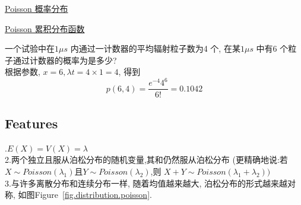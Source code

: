 \documentclass{article}
\begin{document}
\href{http://upload.wikimedia.org/wikipedia/commons/thumb/c/c1/Poisson\_distribution\_PMF.png/325px-Poisson\_distribution\_PMF.png}{Poisson 概率分布}\label{fig.distribution.poisson}

\href{http://upload.wikimedia.org/wikipedia/commons/thumb/8/84/Poisson\_distribution\_CMF.png/325px-Poisson\_distribution\_CMF.png}{Poisson 累积分布函数}\label{fig.distribution.poisson.pmf}

\begin{example}
一个试验中在$1 \mu s$ 内通过一计数器的平均辐射粒子数为4 个, 在某$1\mu s$ 中有6 个粒子通过计数器的概率为是多少?\\
根据参数, $x=6, \lambda t = 4 \times 1=4$, 得到
$$ p(6,4) = \frac{e^{-4} 4^6}{6!} = 0.1042 $$
\end{example}

\subsection{Features}	
.$E(X)=V(X)=\lambda$ \\
2.两个独立且服从泊松分布的随机变量,其和仍然服从泊松分布 (更精确地说:若$X \sim Poisson(\lambda_1)$且$Y \sim Poisson(\lambda_2)$,则 $X+Y \sim Poisson(\lambda_1+\lambda_2))$\\
3.与许多离散分布和连续分布一样, 随着均值越来越大, 泊松分布的形式越来越对称, 如图Figure~\ref{fig.distribution.poisson}.
\end{document}
